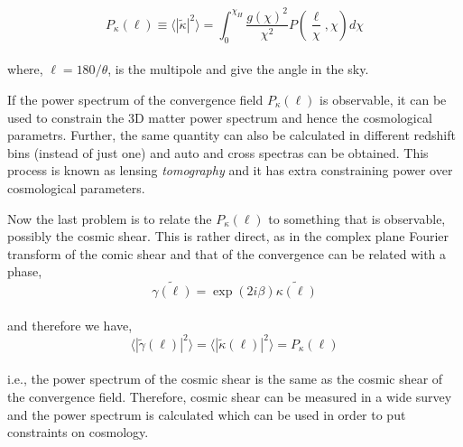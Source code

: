 \begin{equation}
	P_{\kappa}(\ell) \equiv \langle |\tilde{\kappa}|^2 \rangle = 
			\int_0^{\chi_H} \dfrac{g(\chi)^2}{\chi^2} 
			P(\dfrac{\ell}{\chi},\chi) d\chi
\end{equation}
\\
where, $\ell = 180/\theta$, is the multipole and give the angle in the sky. 

If the power spectrum of the convergence field $P_{\kappa}(\ell)$ is observable, it can be
used to constrain the 3D matter power spectrum and hence the cosmological parametrs. Further,
the same quantity can also be calculated in different redshift bins (instead of just one) and
auto and cross spectras can be obtained. This process is known as 
lensing {\it tomography} and it has extra constraining power over cosmological parameters. 

Now the last problem is to relate the $P_{\kappa}(\ell)$ to something that is observable, 
possibly the cosmic shear. This is rather direct, as in the complex plane Fourier transform
of the comic shear and that of the
convergence can be related with a phase,
\begin{equation}
	\tilde{\gamma(\ell)} = \exp(2i\beta) \tilde{\kappa(\ell)}
\end{equation}
\\
and therefore we have,
\begin{equation}
	\langle |\tilde{\gamma}(\ell)|^2 \rangle = 
	\langle |\tilde{\kappa}(\ell)|^2 \rangle = P_{\kappa}(\ell)
\end{equation}
\\
i.e., the power spectrum of the cosmic shear is the same as the cosmic shear of the
convergence field. Therefore, cosmic shear can be measured in a wide survey and the 
power spectrum is calculated which can be used in order to put constraints on
cosmology.





